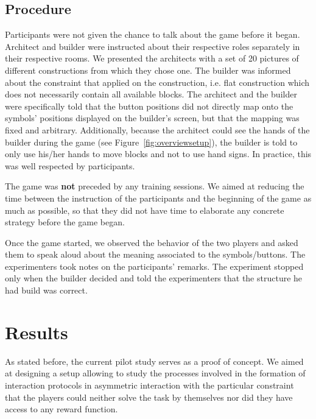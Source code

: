 \subsection{Procedure}
\label{sec:procedure}
Participants were not given the chance to talk about the game before it began. Architect and builder were instructed about their respective roles separately in their respective rooms. We presented the architects with a set of 20 pictures of different constructions from which they chose one. The builder was informed about the constraint that applied on the construction, i.e. flat construction which does not necessarily contain all available blocks. The architect and the builder were specifically told that the button positions did not directly map onto the symbols' positions displayed on the builder's screen, but that the mapping was fixed and arbitrary. Additionally, because the architect could see the hands of the builder during the game (see Figure~\ref{fig:overviewsetup}), the builder is told to only use his/her hands to move blocks and not to use hand signs. In practice, this was well respected by participants.

The game was \textbf{not} preceded by any training sessions. We aimed at reducing the time between the instruction of the participants and the beginning of the game as much as possible, so that they did not have time to elaborate any concrete strategy before the game began.

Once the game started, we observed the behavior of the two players and asked them to speak aloud about the meaning associated to the symbols/buttons. The experimenters took notes on the participants' remarks. The experiment stopped only when the builder decided and told the experimenters that the structure he had build was correct.


\section{Results}

As stated before, the current pilot study serves as a proof of concept. We aimed at designing a setup allowing to study the processes involved in the formation of interaction protocols in asymmetric interaction with the particular constraint that the players could neither solve the task by themselves nor did they have access to any reward function.

